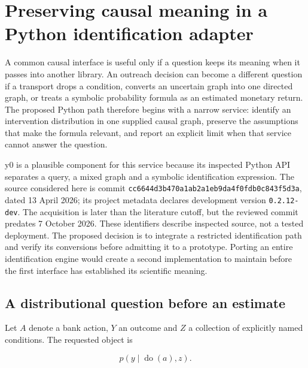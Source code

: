 \hypertarget{preserving-causal-meaning-in-a-python-identification-adapter}{%
\chapter{Preserving causal meaning in a Python identification
adapter}\label{preserving-causal-meaning-in-a-python-identification-adapter}}

\label{exec13:python-identification}

A common causal interface is useful only if a question keeps its meaning
when it passes into another library. An outreach decision can become a
different question if a transport drops a condition, converts an
uncertain graph into one directed graph, or treats a symbolic
probability formula as an estimated monetary return. The proposed Python
path therefore begins with a narrow service: identify an intervention
distribution in one supplied causal graph, preserve the assumptions that
make the formula relevant, and report an explicit limit when that
service cannot answer the question.

y0 is a plausible component for this service because its inspected
Python API separates a query, a mixed graph and a symbolic
identification expression. The source considered here is commit
\texttt{cc6644d3b470a1ab2a1eb9da4f0fdb0c843f5d3a}, dated 13 April 2026;
its project metadata declares development version \texttt{0.2.12-dev}.
The acquisition is later than the literature cutoff, but the reviewed
commit predates 7 October 2026. These identifiers describe inspected
source, not a tested deployment. The proposed decision is to integrate a
restricted identification path and verify its conversions before
admitting it to a prototype. Porting an entire identification engine
would create a second implementation to maintain before the first
interface has established its scientific meaning.
\citep{exec13_y0_api,exec13_y0_metadata}

\hypertarget{a-distributional-question-before-an-estimate}{%
\section{A distributional question before an
estimate}\label{a-distributional-question-before-an-estimate}}

Let \(A\) denote a bank action, \(Y\) an outcome and \(Z\) a collection
of explicitly named conditions. The requested object is

\[
 p(y\mid\operatorname{do}(a),z).
\]


